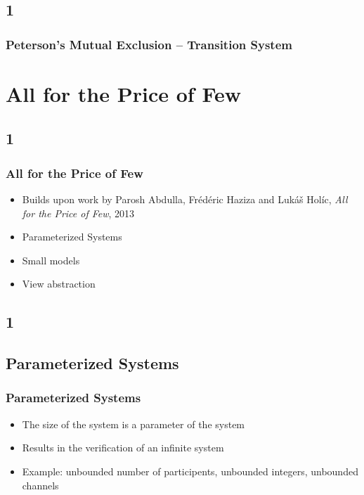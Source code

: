 \documentclass[handout]{beamer}
\begin{document}
\subsection*{1}
\begin{frame}
  \frametitle{Peterson's Mutual Exclusion -- Transition System}
  \begin{example}
    \petersonboth
  \end{example}
\end{frame}


\section{All for the Price of Few}
\subsection*{1}
\begin{frame}
  \frametitle{All for the Price of Few}
  \begin{itemize}
  \item Builds upon work by Parosh Abdulla, Fr\'ed\'eric Haziza and Luk\'a\v{s} Hol\'ic, \emph{All for the Price of Few}, 2013
  \item Parameterized Systems
  \item Small models 
  \item View abstraction
  \end{itemize}
\end{frame}

\subsection*{1}
\subsection{Parameterized Systems}
\begin{frame}
  \frametitle{Parameterized Systems}
  \begin{itemize}
  \item
    The size of the system is a parameter of the system
  \item
    Results in the verification of an infinite system %
  \item
    Example: unbounded number of participents, unbounded integers, unbounded channels
  \end{itemize}
\end{frame}
\end{document}
